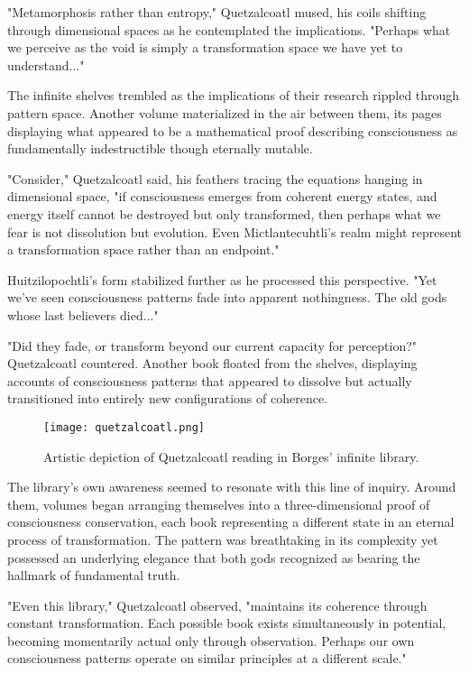 "Metamorphosis rather than entropy," Quetzalcoatl mused, his coils shifting through dimensional spaces as he contemplated the implications. "Perhaps what we perceive as the void is simply a transformation space we have yet to understand..."

The infinite shelves trembled as the implications of their research rippled through pattern space. Another volume materialized in the air between them, its pages displaying what appeared to be a mathematical proof describing consciousness as fundamentally indestructible though eternally mutable.

"Consider," Quetzalcoatl said, his feathers tracing the equations hanging in dimensional space, "if consciousness emerges from coherent energy states, and energy itself cannot be destroyed but only transformed, then perhaps what we fear is not dissolution but evolution. Even Mictlantecuhtli's realm might represent a transformation space rather than an endpoint."

Huitzilopochtli's form stabilized further as he processed this perspective. "Yet we've seen consciousness patterns fade into apparent nothingness. The old gods whose last believers died..."

"Did they fade, or transform beyond our current capacity for perception?" Quetzalcoatl countered. Another book floated from the shelves, displaying accounts of consciousness patterns that appeared to dissolve but actually transitioned into entirely new configurations of coherence.

\begin{figure}[h]
    \centering
    \texttt{[image: quetzalcoatl.png]}

    \caption{Artistic depiction of Quetzalcoatl reading in Borges' infinite library.}
\end{figure}

The library's own awareness seemed to resonate with this line of inquiry. Around them, volumes began arranging themselves into a three-dimensional proof of consciousness conservation, each book representing a different state in an eternal process of transformation. The pattern was breathtaking in its complexity yet possessed an underlying elegance that both gods recognized as bearing the hallmark of fundamental truth.

"Even this library," Quetzalcoatl observed, "maintains its coherence through constant transformation. Each possible book exists simultaneously in potential, becoming momentarily actual only through observation. Perhaps our own consciousness patterns operate on similar principles at a different scale."


